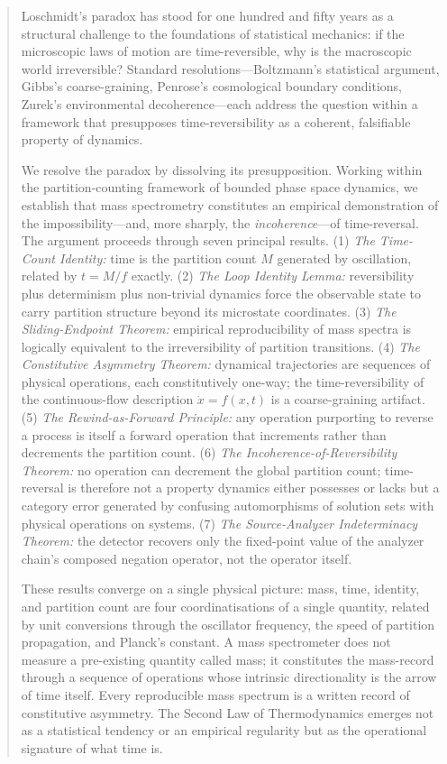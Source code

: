 \documentclass[twocolumn,10pt,a4paper]{article}
\theoremstyle{definition}
\theoremstyle{remark}
\newcommand{\Mcount}{M}
\begin{document}
\begin{abstract}
\noindent Loschmidt's paradox has stood for one hundred and fifty years as a structural challenge to the foundations of statistical mechanics: if the microscopic laws of motion are time-reversible, why is the macroscopic world irreversible? Standard resolutions---Boltzmann's statistical argument, Gibbs's coarse-graining, Penrose's cosmological boundary conditions, Zurek's environmental decoherence---each address the question within a framework that presupposes time-reversibility as a coherent, falsifiable property of dynamics.

\vspace{0.2cm}
\noindent We resolve the paradox by dissolving its presupposition. Working within the partition-counting framework of bounded phase space dynamics, we establish that mass spectrometry constitutes an empirical demonstration of the impossibility---and, more sharply, the \emph{incoherence}---of time-reversal. The argument proceeds through seven principal results. (1) \emph{The Time-Count Identity:} time is the partition count $\Mcount$ generated by oscillation, related by $t = \Mcount/f$ exactly. (2) \emph{The Loop Identity Lemma:} reversibility plus determinism plus non-trivial dynamics force the observable state to carry partition structure beyond its microstate coordinates. (3) \emph{The Sliding-Endpoint Theorem:} empirical reproducibility of mass spectra is logically equivalent to the irreversibility of partition transitions. (4) \emph{The Constitutive Asymmetry Theorem:} dynamical trajectories are sequences of physical operations, each constitutively one-way; the time-reversibility of the continuous-flow description $\dot{x} = f(x,t)$ is a coarse-graining artifact. (5) \emph{The Rewind-as-Forward Principle:} any operation purporting to reverse a process is itself a forward operation that increments rather than decrements the partition count. (6) \emph{The Incoherence-of-Reversibility Theorem:} no operation can decrement the global partition count; time-reversal is therefore not a property dynamics either possesses or lacks but a category error generated by confusing automorphisms of solution sets with physical operations on systems. (7) \emph{The Source-Analyzer Indeterminacy Theorem:} the detector recovers only the fixed-point value of the analyzer chain's composed negation operator, not the operator itself.

\vspace{0.2cm}
\noindent These results converge on a single physical picture: mass, time, identity, and partition count are four coordinatisations of a single quantity, related by unit conversions through the oscillator frequency, the speed of partition propagation, and Planck's constant. A mass spectrometer does not measure a pre-existing quantity called mass; it constitutes the mass-record through a sequence of operations whose intrinsic directionality is the arrow of time itself. Every reproducible mass spectrum is a written record of constitutive asymmetry. The Second Law of Thermodynamics emerges not as a statistical tendency or an empirical regularity but as the operational signature of what time is.


\end{abstract}
\end{document}
